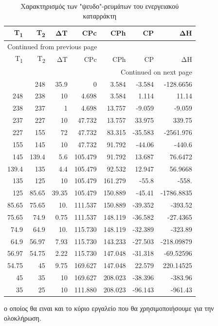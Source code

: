 \documentclass[11pt]{article}
\begin{document}
\begin{longtable}{rrrrrrr}
\caption{Χαρακτηρισμός των "ψευδο"-ρευμάτων του ενεργειακού καταρράκτη}
\\
Τ\textsubscript{1} & T\textsubscript{2} & ΔΤ & CPc & CPh & CP & ΔΗ\\
\hline
\endfirsthead
\multicolumn{7}{l}{Continued from previous page} \\
\hline

Τ\textsubscript{1} & T\textsubscript{2} & ΔΤ & CPc & CPh & CP & ΔΗ \\

\hline
\endhead
\hline\multicolumn{7}{r}{Continued on next page} \\
\endfoot
\endlastfoot
\hline
283.9 & 248 & 35.9 & 0 & 3.584 & -3.584 & -128.6656\\
248 & 238 & 10 & 4.698 & 3.584 & 1.114 & 11.14\\
238 & 237 & 1 & 4.698 & 13.757 & -9.059 & -9.059\\
237 & 227 & 10 & 47.732 & 13.757 & 33.975 & 339.75\\
227 & 155 & 72 & 47.732 & 83.315 & -35.583 & -2561.976\\
155 & 145 & 10 & 47.732 & 91.792 & -44.06 & -440.6\\
145 & 139.4 & 5.6 & 105.479 & 91.792 & 13.687 & 76.6472\\
139.4 & 135 & 4.4 & 105.479 & 92.532 & 12.947 & 56.9668\\
135 & 125 & 10 & 105.479 & 161.279 & -55.8 & -558.\\
125 & 85.65 & 39.35 & 105.479 & 150.889 & -45.41 & -1786.8835\\
85.65 & 75.65 & 10. & 111.537 & 150.889 & -39.352 & -393.52\\
75.65 & 74.9 & 0.75 & 111.537 & 148.119 & -36.582 & -27.4365\\
74.9 & 64.9 & 10. & 115.730 & 148.119 & -32.389 & -323.89\\
64.9 & 56.97 & 7.93 & 115.730 & 143.233 & -27.503 & -218.09879\\
56.97 & 54.75 & 2.22 & 115.730 & 147.048 & -31.318 & -69.52596\\
54.75 & 45 & 9.75 & 169.627 & 147.048 & 22.579 & 220.14525\\
45 & 35 & 10 & 169.627 & 208.023 & -38.396 & -383.96\\
35 & 25 & 10 & 111.880 & 208.023 & -96.143 & -961.43\\
\end{longtable}

ο οποίος θα ειναι και το κύριο εργαλείο που θα χρησιμοποιήσουμε για την ολοκλήρωση.
\end{document}
